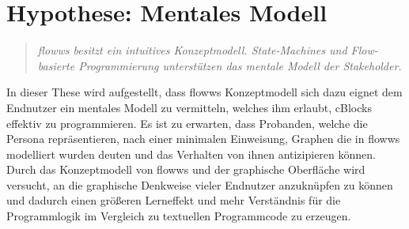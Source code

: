 \section{Hypothese: Mentales Modell}\label{sec:hypothese}
\begin{quote}
    \textit{flowws besitzt ein intuitives Konzeptmodell. State-Machines und Flow-basierte Programmierung unterstützen das mentale Modell der Stakeholder.}
\end{quote}

In dieser These wird aufgestellt, dass flowws Konzeptmodell sich dazu eignet dem Endnutzer ein mentales Modell zu vermitteln, welches ihm erlaubt, cBlocks effektiv zu programmieren. Es ist zu erwarten, dass Probanden, welche die Persona repräsentieren, nach einer minimalen Einweisung, Graphen die in flowws modelliert wurden deuten und das Verhalten von ihnen antizipieren können. Durch das Konzeptmodell von flowws und der graphische Oberfläche wird versucht, an die graphische Denkweise vieler Endnutzer anzuknüpfen zu können und dadurch einen größeren Lerneffekt und mehr Verständnis für die Programmlogik im Vergleich zu textuellen Programmcode zu erzeugen.

